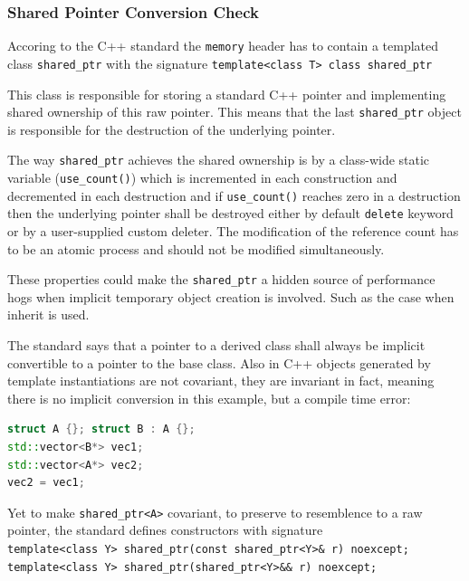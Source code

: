 \subsubsection{Shared Pointer Conversion Check}
\par Accoring to the C++ standard the \verb|memory| header has to contain a templated class \verb|shared_ptr| with the signature \verb|template<class T> class shared_ptr|\cite[\S20.8.2.2]{cpp_standard} \medskip
\par This class is responsible for storing a standard C++ pointer and implementing shared ownership of this raw pointer. This means that the last \verb|shared_ptr| object is responsible for the destruction of the underlying pointer. \medskip
\par The way \verb|shared_ptr| achieves the shared ownership is by a class-wide static variable (\verb|use_count()|) which is incremented in each construction and decremented in each destruction and if \verb|use_count()|  reaches zero in a destruction then the underlying pointer shall be destroyed either by default \verb|delete| keyword or by a user-supplied custom deleter. The modification of the reference count has to be an atomic process and should not be modified simultaneously\cite[\S20.8.2.2 4.]{cpp_standard}. \medskip
\par These properties could make the \verb|shared_ptr| a hidden source of performance hogs when implicit temporary object creation is involved.  Such as the case when inherit is used. \medskip
\par The standard says that a pointer to a derived class shall always be implicit convertible to a pointer to the base class\cite[\S4.10 3.]{cpp_standard}. Also in C++ objects generated  by template instantiations are not covariant, they are invariant in fact, meaning there is no implicit conversion in this example, but a compile time error:
 \begin{lstlisting}[language=c++, frame=single]
struct A {}; struct B : A {};
std::vector<B*> vec1;
std::vector<A*> vec2;
vec2 = vec1;
\end{lstlisting}
\par Yet to make \verb|shared_ptr<A>| covariant, to preserve to resemblence to a raw pointer, the standard defines constructors with signature 
\\ \verb|template<class Y> shared_ptr(const shared_ptr<Y>& r) noexcept;|\\ 
\verb|template<class Y> shared_ptr(shared_ptr<Y>&& r) noexcept;| \\
